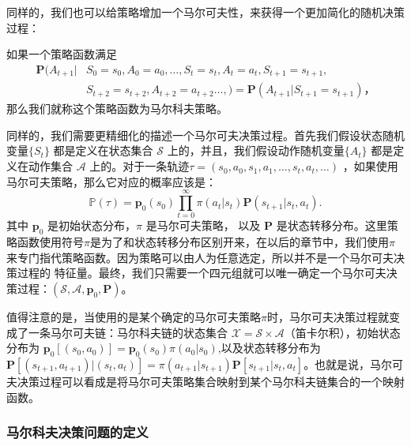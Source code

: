 同样的，我们也可以给策略增加一个马尔可夫性，来获得一个更加简化的随机决策过程：

\begin{definition}
    如果一个策略函数满足
    \begin{equation} 
        \begin{aligned}
            \mathbf{P}(A_{t+1} \vert &S_0 = s_0, A_0 = a_0, \ldots,
                            S_t = s_t, A_t = a_t, S_{t+1} = s_{t+1},\\
                            &S_{t+2} = s_{t+2}, A_{t+2} = a_{t+2}\ldots,)
            = \mathbf{P}(A_{t+1} \vert S_{t+1}=s_{t+1})，
        \end{aligned}
    \end{equation}
    那么我们就称这个策略函数为马尔科夫策略。
\end{definition}

同样的，我们需要更精细化的描述一个马尔可夫决策过程。首先我们假设状态随机变量$\{S_t\}$ 都是定义在状态集合 $\mathcal{S}$ 上的，并且，我们假设动作随机变量$\{A_t\}$ 都是定义在动作集合 $\mathcal{A}$ 上的。对于一条轨迹$\tau = (s_0, a_0, s_1, a_1,\ldots, s_t, a_t,\ldots)$ ，如果使用马尔可夫策略，那么它对应的概率应该是：
\begin{equation}
    \mathbb{P}(\tau) = \mathbf{p}_0(s_0) \prod^{\infty}_{t=0}
    \pi(a_t \vert s_t) \mathbf{P}(s_{t+1} \vert s_t, a_t).
\end{equation}
其中 $\mathbf{p}_0$ 是初始状态分布，$\pi$ 是马尔可夫策略， 以及 $\mathbf{P}$ 是状态转移分布。这里策略函数使用符号$\pi$是为了和状态转移分布区别开来，在以后的章节中，我们使用$\pi$ 来专门指代策略函数。因为策略可以由人为任意选定，所以并不是一个马尔可夫决策过程的
特征量。最终，我们只需要一个四元组就可以唯一确定一个马尔可夫决策过程：$(\mathcal{S}, \mathcal{A}, \mathbf{p}_0, \mathbf{P})$。

值得注意的是，当使用的是某个确定的马尔可夫策略$\pi$时，马尔可夫决策过程就变成了一条马尔可夫链：马尔科夫链的状态集合 $\mathcal{X} = \mathcal{S} \times \mathcal{A}$（笛卡尔积），初始状态分布为 $\mathbf{p}_0[(s_0, a_0)] = \mathbf{p}_0(s_0) \pi(a_0 \vert s_0)$,以及状态转移分布为 $\mathbf{P}[(s_{t+1}, a_{t+1}) \vert (s_t, a_t)] = \pi(a_{t+1} \vert s_{t+1}) \mathbf{P}[s_{t+1} \vert s_t, a_t]$。也就是说，马尔可夫决策过程可以看成是将马尔可夫策略集合映射到某个马尔科夫链集合的一个映射函数。

\subsubsection{马尔科夫决策问题的定义}

